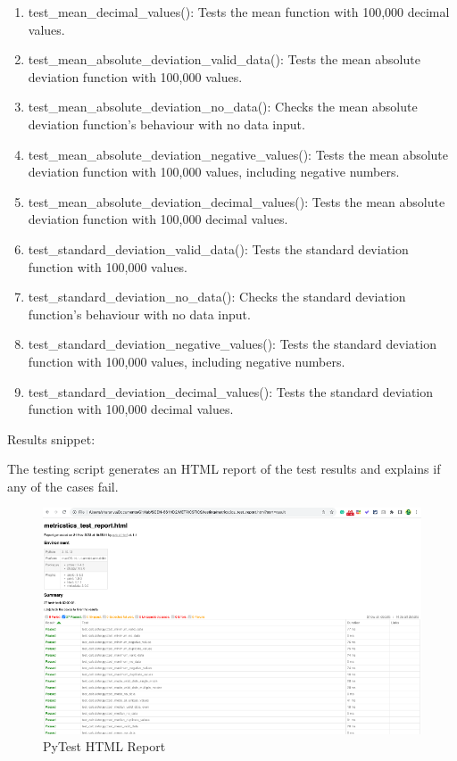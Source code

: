 \documentclass[english,12pt,a4paper]{report}
\begin{document}
\begin{enumerate}
		\item test\_mean\_decimal\_values():  Tests the mean function with 100,000 decimal values.
		\item test\_mean\_absolute\_deviation\_valid\_data():  Tests the mean absolute deviation function with 100,000 values.
		\item test\_mean\_absolute\_deviation\_no\_data():  Checks the mean absolute deviation function's behaviour with no data input.
		\item test\_mean\_absolute\_deviation\_negative\_values():  Tests the mean absolute deviation function with 100,000 values, including negative numbers.
		\item test\_mean\_absolute\_deviation\_decimal\_values():  Tests the mean absolute deviation function with 100,000 decimal values.
		\item test\_standard\_deviation\_valid\_data():  Tests the standard deviation function with 100,000 values.
		\item test\_standard\_deviation\_no\_data():  Checks the standard deviation function's behaviour with no data input.
		\item test\_standard\_deviation\_negative\_values():  Tests the standard deviation function with 100,000 values, including negative numbers.
		\item test\_standard\_deviation\_decimal\_values():  Tests the standard deviation function with 100,000 decimal values.
		
	\end{enumerate}
	
	Results snippet:
	
	The testing script generates an HTML report of the test results and explains if any of the cases fail.
	
	\begin{figure}[H]
		\centering
		\includegraphics[width=0.8\linewidth]{images/test_report_html.png}
		\caption{PyTest HTML Report}
		\label{fig:PyTest HTML Report}
	\end{figure}
	
\end{document}
